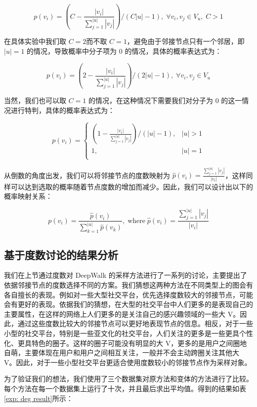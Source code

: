 \documentclass{ctexart}
\begin{document}
$$
p(v_i) = \left(C - \frac{|v_i|}{\sum_{j=1}^{|u|} |v_j|}\right) / \left(C|u| - 1\right), \;\forall v_i, v_j \in V_u, \;C > 1
$$

在具体实验中我们取 \(C = 2\)而不取 \(C = 1\)，避免由于邻接节点只有一个邻居，即 \(|u| = 1\) 的情况，导致概率中分子项为 0 的情况，具体的概率表达式为：

$$
p(v_i) = \left(2 - \frac{|v_i|}{\sum_{j=1}^{|u|} |v_j|}\right) / \left(2|u| - 1\right), \;\forall v_i, v_j \in V_u
$$

当然，我们也可以取 \(C = 1\) 的情况，在这种情况下需要我们对分子为 0 的这一情况进行特判，具体的概率表达式为：

\begin{equation}
p(v_i) = \begin{cases}
    \left ( 1 - \frac{|v_i|}{\sum_{j=1}^{|u|} |v_j|} \right ) / (|u| - 1),& |u| > 1 \\
    1,& |u| = 1 \\
\end{cases}
\end{equation}

从倒数的角度出发，我们可以将邻接节点的度数映射为 \(\hat{p}(v_i) = \frac{\sum_{j=1}^{|u|} |v_j|}{|v_i|}\)，这样同样可以达到选取的概率随着节点度数的增加而减少。因此，我们可以设计出以下的概率映射关系：

$$
p(v_i) = \frac{\hat{p}(v_i)}{\sum_{k=1}^{|u|} \hat{p}(v_k)}, \;\text{where} \;\hat{p}(v_i) = \frac{\sum_{j=1}^{|u|} |v_j|}{|v_i|}
$$

\subsection{基于度数讨论的结果分析}

我们在上节通过度数对 DeepWalk 的采样方法进行了一系列的讨论，主要提出了依据邻接节点的度数选择不同的方案。我们猜想这两种方法在不同类型上的图会有各自擅长的表现。例如对一些大型社交平台，优先选择度数较大的邻接节点，可能会有更好的表现。依据我们的猜想，在大型的社交平台中人们更多的是表现自己的主要属性，在这样的网络上人们更多的是关注自己的感兴趣领域的一些大 V。因此，通过这些度数比较大的邻接节点可以更好地表现节点的信息。相反，对于一些小型的社交平台，特别是一些亚文化的社交平台，人们关注的更多是一些更具个性化、更具特色的圈子。这样的圈子可能没有明显的大 V，更多的是用户之间圈地自萌，主要体现在用户和用户之间相互关注，一般并不会主动跨圈关注其他大 V。因此，对于一些小型社交平台更适合使用度数较小的邻接节点作为采样对象。

为了验证我们的想法，我们使用了三个数据集对原方法和变体的方法进行了比较。每个方法在每一个数据集上运行了十次，并且最后求出平均值。得到的结果如表 \ref{exp: deg result}所示：
\end{document}

